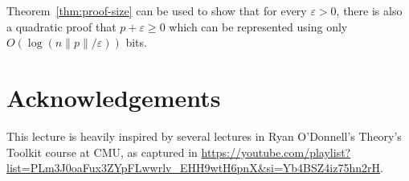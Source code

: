 \documentclass[11pt]{article}
\renewcommand{\epsilon}{\varepsilon}
\newcommand{\eps}{\epsilon}
\begin{document}
Theorem~\ref{thm:proof-size} can be used to show that for every $\eps > 0$, there is also a quadratic proof that $p + \eps \geq 0$ which can be represented using only $O(\log(n \|p\|/\eps))$ bits.


\section*{Acknowledgements}
This lecture is heavily inspired by several lectures in Ryan O'Donnell's Theory's Toolkit course at CMU, as captured in \url{https://youtube.com/playlist?list=PLm3J0oaFux3ZYpFLwwrlv_EHH9wtH6pnX&si=Yb4BSZ4iz75hn2rH}.



\end{document}
